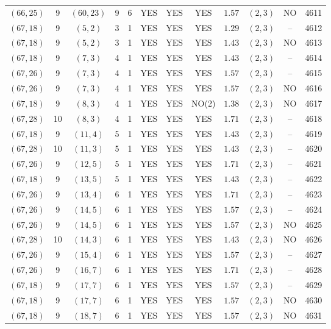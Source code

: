 \begin{longtable}{|c|c|c|c|c|c|c|c|c|c|c|c|}
$(66,25)$ & 9 & $(60,23)$ & 9 & 6 & YES & YES & YES & $1.57$ & $(2,3)$ & NO & 4611\\
$(67,18)$ & 9 & $(5,2)$ & 3 & 1 & YES & YES & YES & $1.29$ & $(2,3)$ & -- & 4612\\
$(67,18)$ & 9 & $(5,2)$ & 3 & 1 & YES & YES & YES & $1.43$ & $(2,3)$ & NO & 4613\\
$(67,18)$ & 9 & $(7,3)$ & 4 & 1 & YES & YES & YES & $1.43$ & $(2,3)$ & -- & 4614\\
$(67,26)$ & 9 & $(7,3)$ & 4 & 1 & YES & YES & YES & $1.57$ & $(2,3)$ & -- & 4615\\
$(67,26)$ & 9 & $(7,3)$ & 4 & 1 & YES & YES & YES & $1.57$ & $(2,3)$ & NO & 4616\\
$(67,18)$ & 9 & $(8,3)$ & 4 & 1 & YES & YES & NO(2) & $1.38$ & $(2,3)$ & NO & 4617\\
$(67,28)$ & 10 & $(8,3)$ & 4 & 1 & YES & YES & YES & $1.71$ & $(2,3)$ & -- & 4618\\
$(67,18)$ & 9 & $(11,4)$ & 5 & 1 & YES & YES & YES & $1.43$ & $(2,3)$ & -- & 4619\\
$(67,28)$ & 10 & $(11,3)$ & 5 & 1 & YES & YES & YES & $1.43$ & $(2,3)$ & -- & 4620\\
$(67,26)$ & 9 & $(12,5)$ & 5 & 1 & YES & YES & YES & $1.71$ & $(2,3)$ & -- & 4621\\
$(67,18)$ & 9 & $(13,5)$ & 5 & 1 & YES & YES & YES & $1.43$ & $(2,3)$ & -- & 4622\\
$(67,26)$ & 9 & $(13,4)$ & 6 & 1 & YES & YES & YES & $1.71$ & $(2,3)$ & -- & 4623\\
$(67,26)$ & 9 & $(14,5)$ & 6 & 1 & YES & YES & YES & $1.57$ & $(2,3)$ & -- & 4624\\
$(67,26)$ & 9 & $(14,5)$ & 6 & 1 & YES & YES & YES & $1.57$ & $(2,3)$ & NO & 4625\\
$(67,28)$ & 10 & $(14,3)$ & 6 & 1 & YES & YES & YES & $1.43$ & $(2,3)$ & NO & 4626\\
$(67,26)$ & 9 & $(15,4)$ & 6 & 1 & YES & YES & YES & $1.57$ & $(2,3)$ & -- & 4627\\
$(67,26)$ & 9 & $(16,7)$ & 6 & 1 & YES & YES & YES & $1.71$ & $(2,3)$ & -- & 4628\\
$(67,18)$ & 9 & $(17,7)$ & 6 & 1 & YES & YES & YES & $1.57$ & $(2,3)$ & -- & 4629\\
$(67,18)$ & 9 & $(17,7)$ & 6 & 1 & YES & YES & YES & $1.57$ & $(2,3)$ & NO & 4630\\
$(67,18)$ & 9 & $(18,7)$ & 6 & 1 & YES & YES & YES & $1.57$ & $(2,3)$ & NO & 4631\\

\end{longtable}
